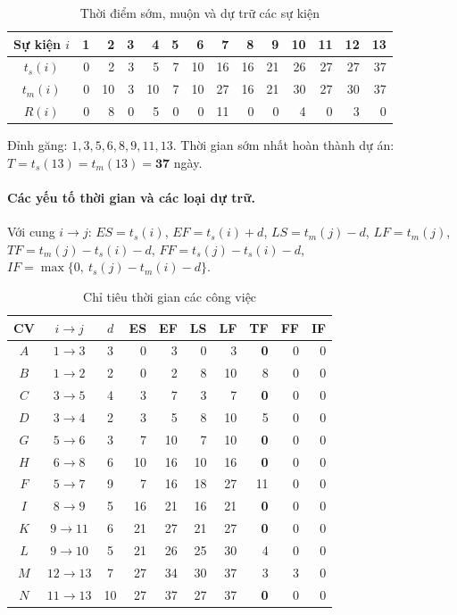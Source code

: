 \documentclass[12pt,a4paper]{article}
\begin{document}
\begin{table}[H]\centering
\caption{Thời điểm sớm, muộn và dự trữ các sự kiện}
\small
\begin{tabular}{c|rrrrrrrrrrrrr}
\toprule
Sự kiện $i$ & 1 & 2 & 3 & 4 & 5 & 6 & 7 & 8 & 9 & 10 & 11 & 12 & 13\\
\midrule
$t_s(i)$ & 0 & 2 & 3 & 5 & 7 & 10 & 16 & 16 & 21 & 26 & 27 & 27 & 37\\
$t_m(i)$ & 0 & 10 & 3 & 10 & 7 & 10 & 27 & 16 & 21 & 30 & 27 & 30 & 37\\
$R(i)$   & 0 & 8 & 0 & 5 & 0 & 0 & 11 & 0 & 0 & 4 & 0 & 3 & 0\\
\bottomrule
\end{tabular}
\end{table}

Đỉnh găng: $1,3,5,6,8,9,11,13$.
Thời gian sớm nhất hoàn thành dự án: $T=t_s(13)=t_m(13)=\mathbf{37}$ ngày.

\paragraph{Các yếu tố thời gian và các loại dự trữ.}
Với cung $i\rightarrow j$:
$ES=t_s(i)$, $EF=t_s(i)+d$, $LS=t_m(j)-d$, $LF=t_m(j)$,
$TF=t_m(j)-t_s(i)-d$,
$FF=t_s(j)-t_s(i)-d$,
$IF=\max\{0,\ t_s(j)-t_m(i)-d\}$.

\begin{table}[H]\centering
\caption{Chỉ tiêu thời gian các công việc}
\small
\begin{tabular}{c|c|c|rr|rr|rrr}
\toprule
\textbf{CV} & $i\!\rightarrow\!j$ & $d$ & ES & EF & LS & LF & TF & FF & IF\\
\midrule
$A$ & $1\rightarrow 3$ & 3 & 0 & 3 & 0 & 3 & \textbf{0} & 0 & 0\\
$B$ & $1\rightarrow 2$ & 2 & 0 & 2 & 8 & 10 & 8 & 0 & 0\\
$C$ & $3\rightarrow 5$ & 4 & 3 & 7 & 3 & 7 & \textbf{0} & 0 & 0\\
$D$ & $3\rightarrow 4$ & 2 & 3 & 5 & 8 & 10 & 5 & 0 & 0\\
$G$ & $5\rightarrow 6$ & 3 & 7 & 10 & 7 & 10 & \textbf{0} & 0 & 0\\
$H$ & $6\rightarrow 8$ & 6 & 10 & 16 & 10 & 16 & \textbf{0} & 0 & 0\\
$F$ & $5\rightarrow 7$ & 9 & 7 & 16 & 18 & 27 & 11 & 0 & 0\\
$I$ & $8\rightarrow 9$ & 5 & 16 & 21 & 16 & 21 & \textbf{0} & 0 & 0\\
$K$ & $9\rightarrow 11$ & 6 & 21 & 27 & 21 & 27 & \textbf{0} & 0 & 0\\
$L$ & $9\rightarrow 10$ & 5 & 21 & 26 & 25 & 30 & 4 & 0 & 0\\
$M$ & $12\rightarrow 13$ & 7 & 27 & 34 & 30 & 37 & 3 & 3 & 0\\
$N$ & $11\rightarrow 13$ & 10 & 27 & 37 & 27 & 37 & \textbf{0} & 0 & 0\\
\bottomrule
\end{tabular}
\end{table}
\end{document}
